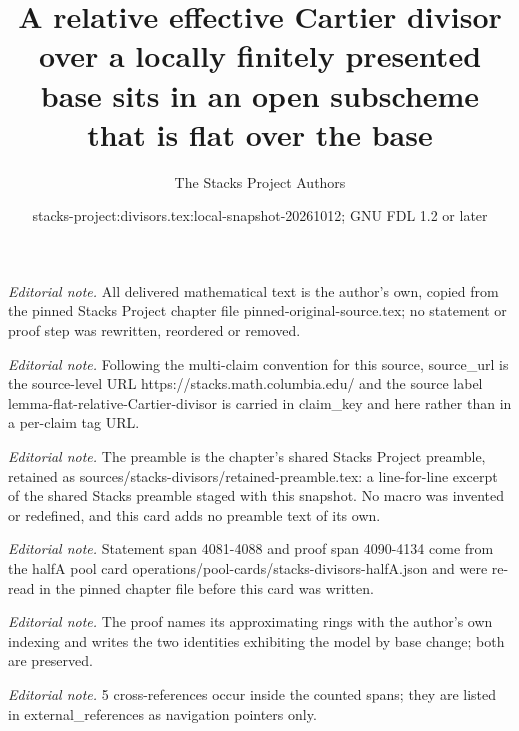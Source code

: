 \documentclass[10pt,a4paper]{amsart}
\title{A relative effective Cartier divisor over a locally finitely presented base sits in an open subscheme that is flat over the base}
\author{The Stacks Project Authors}
\date{stacks-project:divisors.tex:local-snapshot-20261012; GNU FDL 1.2 or later}
\theoremstyle{plain}
\theoremstyle{definition}
\theoremstyle{remark}
\numberwithin{equation}{subsection}
\begin{document}
\maketitle
\noindent\textit{Editorial note.} All delivered mathematical text is the author's own, copied from the pinned Stacks Project chapter file pinned-original-source.tex; no statement or proof step was rewritten, reordered or removed.\par\medskip
\noindent\textit{Editorial note.} Following the multi-claim convention for this source, source\_url is the source-level URL https://stacks.math.columbia.edu/ and the source label lemma-flat-relative-Cartier-divisor is carried in claim\_key and here rather than in a per-claim tag URL.\par\medskip
\noindent\textit{Editorial note.} The preamble is the chapter's shared Stacks Project preamble, retained as sources/stacks-divisors/retained-preamble.tex: a line-for-line excerpt of the shared Stacks preamble staged with this snapshot. No macro was invented or redefined, and this card adds no preamble text of its own.\par\medskip
\noindent\textit{Editorial note.} Statement span 4081-4088 and proof span 4090-4134 come from the halfA pool card operations/pool-cards/stacks-divisors-halfA.json and were re-read in the pinned chapter file before this card was written.\par\medskip
\noindent\textit{Editorial note.} The proof names its approximating rings with the author's own indexing and writes the two identities exhibiting the model by base change; both are preserved.\par\medskip
\noindent\textit{Editorial note.} 5 cross-references occur inside the counted spans; they are listed in external\_references as navigation pointers only.\par\medskip
\end{document}
